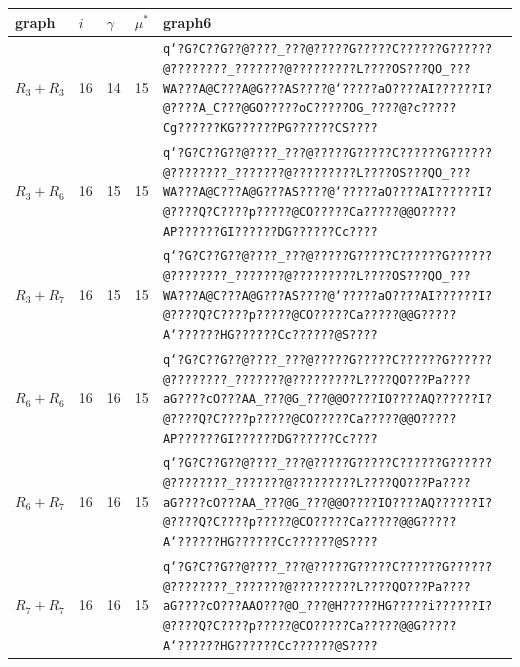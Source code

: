 \documentclass[11pt]{article}
\theoremstyle{remark}\newtheorem{remark}[theorem]{Remark}
\begin{document}
\begin{center}\begin{tabular}{lllll}\toprule graph & $i$ & $\gamma$ & $\mu^*$ & graph6\\\midrule
$R_3+R_3$ & 16 & 14 & 15 & \texttt{q`?G?C??G??@????\_???@?????G?????C??????G??????@????????\_???????@?????????L????OS???QO\_???WA???A@C???A@G???AS????@`?????aO????AI??????I?@????A\_C???@GO?????oC?????OG\_????@?c?????Cg??????KG??????PG??????CS????}\\
$R_3+R_6$ & 16 & 15 & 15 & \texttt{q`?G?C??G??@????\_???@?????G?????C??????G??????@????????\_???????@?????????L????OS???QO\_???WA???A@C???A@G???AS????@`?????aO????AI??????I?@????Q?C????p?????@CO?????Ca?????@@O?????AP??????GI??????DG??????Cc????}\\
$R_3+R_7$ & 16 & 15 & 15 & \texttt{q`?G?C??G??@????\_???@?????G?????C??????G??????@????????\_???????@?????????L????OS???QO\_???WA???A@C???A@G???AS????@`?????aO????AI??????I?@????Q?C????p?????@CO?????Ca?????@@G?????A`??????HG??????Cc??????@S????}\\
$R_6+R_6$ & 16 & 16 & 15 & \texttt{q`?G?C??G??@????\_???@?????G?????C??????G??????@????????\_???????@?????????L????QO???Pa????aG????cO???AA\_???@G\_???@@O????IO????AQ??????I?@????Q?C????p?????@CO?????Ca?????@@O?????AP??????GI??????DG??????Cc????}\\
$R_6+R_7$ & 16 & 16 & 15 & \texttt{q`?G?C??G??@????\_???@?????G?????C??????G??????@????????\_???????@?????????L????QO???Pa????aG????cO???AA\_???@G\_???@@O????IO????AQ??????I?@????Q?C????p?????@CO?????Ca?????@@G?????A`??????HG??????Cc??????@S????}\\
$R_7+R_7$ & 16 & 16 & 15 & \texttt{q`?G?C??G??@????\_???@?????G?????C??????G??????@????????\_???????@?????????L????QO???Pa????aG????cO???AAO???@O\_???@H?????HG?????i??????I?@????Q?C????p?????@CO?????Ca?????@@G?????A`??????HG??????Cc??????@S????}\\
\bottomrule\end{tabular}\end{center}
\end{document}
